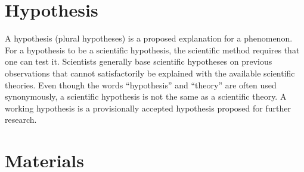 \documentclass{article} %
\newcounter{source}
\begin{document}
\section{Hypothesis}

A hypothesis (plural hypotheses) is a proposed explanation for a phenomenon. For a hypothesis to be a scientific hypothesis, the scientific method requires that one can test it. Scientists generally base scientific hypotheses on previous observations that cannot satisfactorily be explained with the available scientific theories. Even though the words ``hypothesis'' and ``theory'' are often used synonymously, a scientific hypothesis is not the same as a scientific theory. A working hypothesis is a provisionally accepted hypothesis proposed for further research.





\section {Materials}











\end{document}
